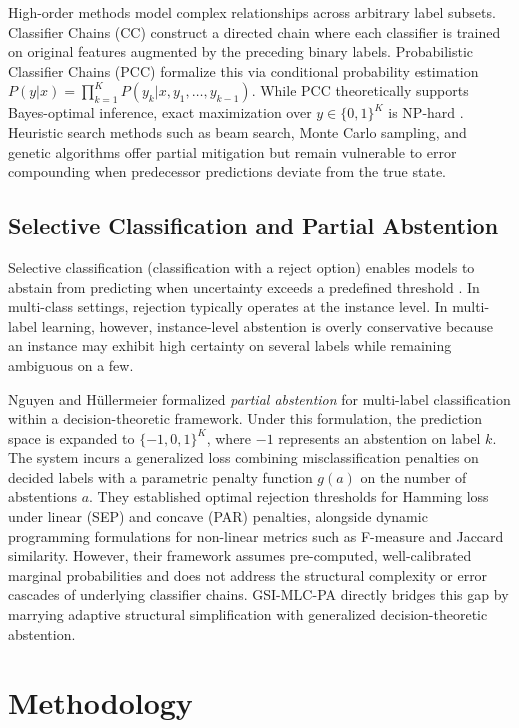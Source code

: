 \documentclass[conference]{IEEEtran}
\begin{document}
High-order methods model complex relationships across arbitrary label subsets. Classifier Chains (CC) \cite{read2011classifier} construct a directed chain where each classifier is trained on original features augmented by the preceding binary labels. Probabilistic Classifier Chains (PCC) \cite{cheng2010bayes} formalize this via conditional probability estimation $P(y|x) = \prod_{k=1}^K P(y_k|x, y_1, \dots, y_{k-1})$. While PCC theoretically supports Bayes-optimal inference, exact maximization over $y \in \{0,1\}^K$ is NP-hard \cite{dembczynski2012consistent}. Heuristic search methods such as beam search, Monte Carlo sampling, and genetic algorithms \cite{read2011classifier} offer partial mitigation but remain vulnerable to error compounding when predecessor predictions deviate from the true state.

\subsection{Selective Classification and Partial Abstention}
Selective classification (classification with a reject option) enables models to abstain from predicting when uncertainty exceeds a predefined threshold \cite{geifman2017selective}. In multi-class settings, rejection typically operates at the instance level. In multi-label learning, however, instance-level abstention is overly conservative because an instance may exhibit high certainty on several labels while remaining ambiguous on a few.

Nguyen and H\"ullermeier \cite{nguyen2021multilabel} formalized \textit{partial abstention} for multi-label classification within a decision-theoretic framework. Under this formulation, the prediction space is expanded to $\{-1, 0, 1\}^K$, where $-1$ represents an abstention on label $k$. The system incurs a generalized loss combining misclassification penalties on decided labels with a parametric penalty function $g(a)$ on the number of abstentions $a$. They established optimal rejection thresholds for Hamming loss under linear (SEP) and concave (PAR) penalties, alongside dynamic programming formulations for non-linear metrics such as F-measure and Jaccard similarity. However, their framework assumes pre-computed, well-calibrated marginal probabilities and does not address the structural complexity or error cascades of underlying classifier chains. GSI-MLC-PA directly bridges this gap by marrying adaptive structural simplification with generalized decision-theoretic abstention.

\section{Methodology}
\end{document}

